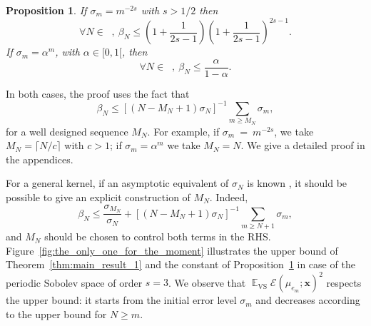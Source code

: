 \documentclass[twoside,11pt]{book}
\newtheorem{proposition}{Proposition}
\DeclareMathOperator{\VS}{\mathrm{VS}}
\DeclareMathOperator{\EX}{\mathbb{E}}
\DeclareMathOperator{\Ns}{\mathbb{N}^{*}}
\begin{document}
\begin{proposition}\label{prop:constant_bound}
If $\sigma_{m} = m^{-2s}$ with $s >1/2$ then
\begin{equation}
\forall N \in \Ns, \: \beta_{N} \leq \left(1+\frac{1}{2s-1}\right)\left(1+\frac{1}{2s-1}\right)^{2s-1}.
\end{equation}
If $\sigma_{m} = \alpha^{m}$, with $\alpha \in [0,1[$, then
\begin{equation}
\forall N \in \Ns, \: \beta_{N} \leq \frac{\alpha}{1-\alpha}.
\end{equation}
\end{proposition}
In both cases, the proof uses the fact that
\begin{equation}
\beta_{N} \leq [(N-M_{N}+1)\sigma_N]^{-1} \sum_{m \geq M_{N}} \sigma_m,
\end{equation}
for a well designed sequence $M_{N}$. For example, if $\sigma_{m}~=~m^{-2s}$, we take $M_{N} = \lceil{N/c \rceil}$ with $c >1$; if $\sigma_{m} = \alpha^{m}$ we take $M_N = N$. We give a detailed proof in the appendices.

 For a general kernel, if an asymptotic equivalent of $\sigma_{N}$ is known \citep{Wid63,Wid64}, it should be possible to give an explicit construction of $M_N$. Indeed,
\begin{equation}
 \beta_{N} \leq \frac{\sigma_{M_{N}}}{\sigma_{N}} + [{(N-M_{N}+1)\sigma_{N}}]^{-1} \sum\limits_{m \geq N+1}\sigma_{m},
\end{equation}
and $M_{N}$ should be chosen to control both terms in the RHS.
%
Figure~\ref{fig:the_only_one_for_the_moment} illustrates the upper bound of Theorem~\ref{thm:main_result_1} and the constant of Proposition~\ref{prop:constant_bound} in case of the periodic Sobolev space of order $s=3$. We observe that $\EX_{\VS} \mathcal{E}(\mu_{e_m};\bm{x})^{2}$ respects the upper bound: it starts from the initial error level $\sigma_m$ and decreases according to the upper bound for $N \geq m$.
\end{document}
